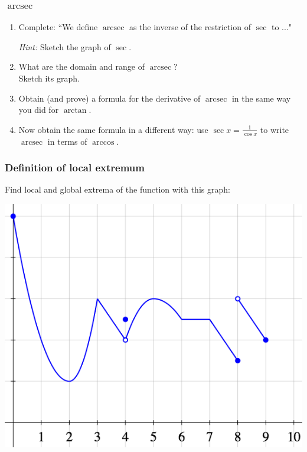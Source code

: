 \begin{frame}[t]
	\frametitle{$\operatorname{arcsec}$}

	\begin{enumerate}
		\item Complete: ``We define $\operatorname{arcsec}$ as the inverse of the
			restriction of $\sec$ to ..."

			\emph{Hint:} Sketch the graph of $\sec$.

			\vfill

		\item What are the domain and range of $\operatorname{arcsec}$? \\ Sketch
			its graph.

			\vfill

		\item Obtain (and prove) a formula for the derivative of $\operatorname{arcsec}$
			in the same way you did for $\arctan$.

			\vfill

		\item Now obtain the same formula in a different way: use
			$\displaystyle \sec x = \frac{1}{\cos x}$ to write
			$\displaystyle \operatorname{arcsec}$ in terms of $\displaystyle \arccos$.
	\end{enumerate}
\end{frame}

\begin{frame}
	\frametitle{Definition of local extremum}

	Find local and global extrema of the function with this graph:

	\begin{center}
		\includegraphics[scale=.42]{G13}
	\end{center}
\end{frame}

